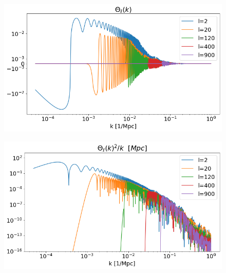 \documentclass[10pt, a4paper]{article}
\begin{document}
\begin{figure}[h!]
    \centering
    \includegraphics[scale=0.5]{../m4_figs/Theta.png}
    \caption{}
    \label{}
\end{figure}

\begin{figure}[h!]
    \centering
    \includegraphics[scale=0.5]{../m4_figs/Theta2.png}
    \caption{}
    \label{}
\end{figure}



\newpage


\end{document}
